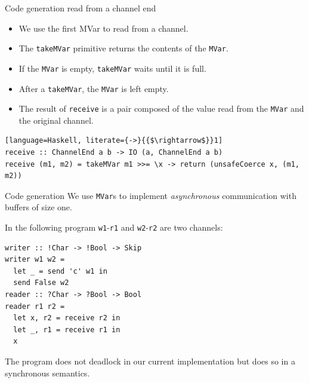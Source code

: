 \documentclass[10pt]{beamer}
\begin{document}
\begin{frame}[fragile]{Code generation \hfill {\color{mLightBrown} read from a channel end}}

\begin{tcolorbox}
\begin{itemize}
	\item We use the first MVar to read from a channel. \pause
	\item The \lstinline|takeMVar| primitive returns the contents of the
\lstinline|MVar|. \pause
	\item If the \lstinline|MVar| is empty,
\lstinline|takeMVar| waits until it is full. \pause
	\item After a
\lstinline|takeMVar|, the \lstinline|MVar| is left empty.\pause
\item The result
of \lstinline|receive| is a pair composed of the value read from the
\lstinline|MVar| and the original channel.
\end{itemize}
\end{tcolorbox}

\pause
\begin{lstlisting}[language=Haskell, literate={->}{{$\rightarrow$}}1]
receive :: ChannelEnd a b -> IO (a, ChannelEnd a b)
receive (m1, m2) = takeMVar m1 >>= \x -> return (unsafeCoerce x, (m1, m2))
\end{lstlisting}

\end{frame}

\begin{frame}[fragile]{Code generation}
We use
\lstinline|MVar|s to implement \emph{asynchronous} communication with
buffers of size one. \pause

In the following program
\lstinline|w1|-\lstinline|r1| and \lstinline|w2|-\lstinline|r2| are
two channels:
%
\begin{lstlisting}
writer :: !Char -> !Bool -> Skip
writer w1 w2 =
  let _ = send 'c' w1 in
  send False w2
reader :: ?Char -> ?Bool -> Bool
reader r1 r2 =
  let x, r2 = receive r2 in
  let _, r1 = receive r1 in
  x
\end{lstlisting}
%
The program does not deadlock in our current implementation but does
so in a synchronous semantics.	
\end{frame}
\end{document}
